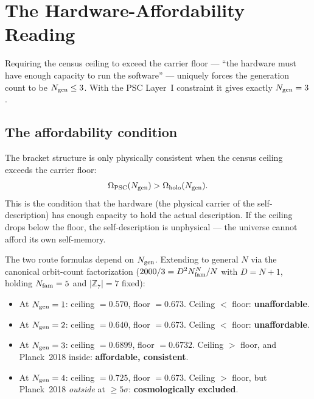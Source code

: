 \documentclass[11pt,a4paper]{article}
\newcommand{\ZS}{\mathbb{Z}_7}
\newcommand{\Ngen}{N_{\rm gen}}
\begin{document}
\section{The Hardware-Affordability Reading}
\label{sec:hardware}

\begin{tcolorbox}[colback=boxgreen,colframe=green!50!black,
  title={Key idea}]
Requiring the census ceiling to exceed the carrier floor --- ``the hardware
must have enough capacity to run the software'' --- uniquely forces the
generation count to be $N_{\rm gen} \leq 3$.  With the PSC Layer~I constraint
it gives exactly $N_{\rm gen} = 3$.
\end{tcolorbox}

\subsection{The affordability condition}

The bracket structure is only physically consistent when the census ceiling
exceeds the carrier floor:
\[
  \Omega_{\rm PSC}(N_{\rm gen}) > \Omega_{\rm holo}(N_{\rm gen}).
\]
This is the condition that the hardware (the physical carrier of the
self-description) has enough capacity to hold the actual description.  If the
ceiling drops below the floor, the self-description is unphysical --- the
universe cannot afford its own self-memory.

The two route formulas depend on $\Ngen$.  Extending to general $N$ via
the canonical orbit-count factorization
($2000/3 = D^2 N_{\rm fam}^N/N$ with $D = N+1$, holding $N_{\rm fam} = 5$
and $|\ZS| = 7$ fixed):

\begin{itemize}[itemsep=3pt]
  \item At $N_{\rm gen} = 1$: ceiling $= 0.570$, floor $= 0.673$.
    Ceiling $<$ floor: \textbf{unaffordable}.
  \item At $N_{\rm gen} = 2$: ceiling $= 0.640$, floor $= 0.673$.
    Ceiling $<$ floor: \textbf{unaffordable}.
  \item At $N_{\rm gen} = 3$: ceiling $= 0.6899$, floor $= 0.6732$.
    Ceiling $>$ floor, and Planck~2018 inside: \textbf{affordable, consistent}.
  \item At $N_{\rm gen} = 4$: ceiling $= 0.725$, floor $= 0.673$.
    Ceiling $>$ floor, but Planck~2018 \emph{outside} at $\geq 5\sigma$:
    \textbf{cosmologically excluded}.
\end{itemize}
\end{document}
